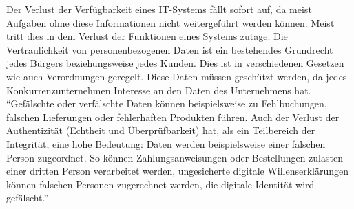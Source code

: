 Der Verlust der Verfügbarkeit eines IT-Systems fällt sofort auf, da meist Aufgaben ohne diese Informationen nicht weitergeführt werden können. Meist tritt dies in dem Verlust der Funktionen eines Systems zutage. Die Vertraulichkeit von personenbezogenen Daten ist ein bestehendes Grundrecht jedes Bürgers beziehungsweise jedes Kunden. Dies ist in verschiedenen Gesetzen wie auch Verordnungen geregelt. Diese Daten müssen geschützt werden, da jedes Konkurrenzunternehmen Interesse an den Daten des Unternehmens hat. \enquote{Gefälschte oder verfälschte Daten können beispielsweise zu Fehlbuchungen, falschen Lieferungen oder fehlerhaften Produkten führen. Auch der Verlust der Authentizität (Echtheit und Überprüfbarkeit) hat, als ein Teilbereich der Integrität, eine hohe Bedeutung: Daten werden beispielsweise einer falschen Person zugeordnet. So können Zahlungsanweisungen oder Bestellungen zulasten einer dritten Person verarbeitet werden, ungesicherte digitale Willenserklärungen können falschen Personen zugerechnet werden, die digitale Identität wird	gefälscht.}\autocite[][S.\,1]{bundesamt_fur_sicherheit_in_der_informationstechnik_bsi_it-grundschutz-kompendium_2020}

